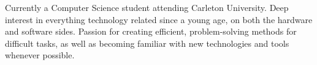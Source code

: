

\begin{cvparagraph}

Currently a Computer Science student attending Carleton University. Deep interest in everything technology related since a young age, on both the hardware and software sides. Passion for creating efficient, problem-solving methods for difficult tasks, as well as becoming familiar with new technologies and tools whenever possible.
\end{cvparagraph}
